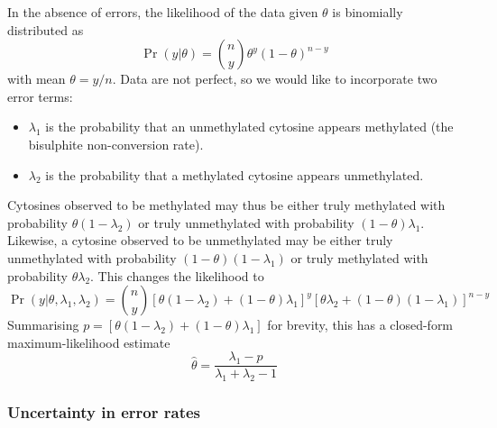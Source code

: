 \documentclass[12pt,longbibliography]{article}
\begin{document}
In the absence of errors, the likelihood of the data given $\theta$ is binomially distributed as
\begin{equation}
    \label{eqn:classic-binomial}
    \Pr(y| \theta) = {n \choose y} \theta^y(1-\theta)^{n-y}
\end{equation}
with mean $\theta=y/n$.
Data are not perfect, so we would like to incorporate two error terms:
\begin{itemize}
    \item $\lambda_1$ is the probability that an unmethylated cytosine appears methylated (the bisulphite non-conversion rate).
    \item $\lambda_2$ is the probability that a methylated cytosine appears unmethylated.
\end{itemize}
Cytosines observed to be methylated may thus be either truly methylated with probability $\theta(1-\lambda_2)$ or truly unmethylated with probability $(1-\theta)\lambda_1$. Likewise, a cytosine observed to be unmethylated may be either truly unmethylated with probability $(1-\theta)(1-\lambda_1)$ or truly methylated with probability $\theta \lambda_2$.
This changes the likelihood to
\begin{equation}
    \label{eqn:binom-with-errors}
    \Pr(y | \theta, \lambda_1, \lambda_2) = 
    {n \choose y}
    [\theta(1-\lambda_2) + (1-\theta)\lambda_1]^y
    [\theta \lambda_2 + (1-\theta)(1-\lambda_1)]^{n-y}
\end{equation}
Summarising $p=[\theta(1-\lambda_2) + (1-\theta)\lambda_1]$ for brevity, this has a closed-form maximum-likelihood estimate
\begin{equation}
    \label{eqn:ml-theta}
    \hat{\theta} = \frac{\lambda_1-p}{\lambda_1 + \lambda_2 -1}
\end{equation}

\subsubsection{Uncertainty in error rates}
\end{document}
